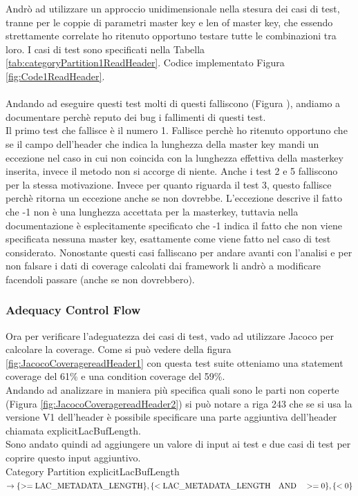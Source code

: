 \documentclass[10pt, a4paper]{article}
\begin{document}
Andrò ad utilizzare un approccio unidimensionale nella stesura dei casi 
di test, tranne per le coppie di parametri master key e len of master key,
che essendo strettamente correlate ho ritenuto opportuno testare tutte le 
combinazioni tra loro.
I casi di test sono specificati nella Tabella \ref{tab:categoryPartition1ReadHeader}.
Codice implementato Figura \ref{fig:Code1ReadHeader}. \\ \\
Andando ad eseguire questi test molti di questi falliscono (Figura ), andiamo a documentare perchè reputo 
dei bug i fallimenti di questi test. \\
Il primo test che fallisce è il numero 1. Fallisce perchè ho ritenuto opportuno che se il campo dell'header 
che indica la lunghezza della master key mandi un eccezione nel caso in cui non coincida con la lunghezza effettiva 
della masterkey inserita, invece il metodo non si accorge di niente.
Anche i test 2 e 5 falliscono per la stessa motivazione. 
Invece per quanto riguarda il test 3, questo fallisce perchè ritorna un eccezione anche se non dovrebbe. 
L'eccezione descrive il fatto che -1 non è una lunghezza accettata per la masterkey, tuttavia nella documentazione è
esplecitamente specificato che -1 indica il fatto che non viene specificata nessuna master key, esattamente come viene 
fatto nel caso di test considerato. 
Nonostante questi casi falliscano per andare avanti con l'analisi e per non falsare i dati di coverage calcolati
dai framework li andrò a modificare facendoli passare (anche se non dovrebbero).


\subsubsection{Adequacy Control Flow}
Ora per verificare l'adeguatezza dei casi di test, vado ad utilizzare
Jacoco per calcolare la coverage. Come si può vedere della figura \ref{fig:JacocoCoveragereadHeader1} con questa test suite otteniamo
una statement coverage del 61\% e una condition coverage del 59\%. \\
Andando ad analizzare in maniera più specifica quali sono le parti non coperte (Figura \ref{fig:JacocoCoveragereadHeader2})
si può notare a riga 243 che se si usa la versione V1 dell'header è possibile specificare una parte aggiuntiva dell'header
chiamata explicitLacBufLength. \\
Sono andato quindi ad aggiungere un valore di input ai test e due casi di test per coprire questo input aggiuntivo. \\
Category Partition explicitLacBufLength $\rightarrow
\{ >= \text{LAC\_METADATA\_LENGTH} \}, \\
\{ <  \text{LAC\_METADATA\_LENGTH}\quad \textrm{AND} \quad >= 0\}, 
\{ < 0 \}$ 
\end{document}

